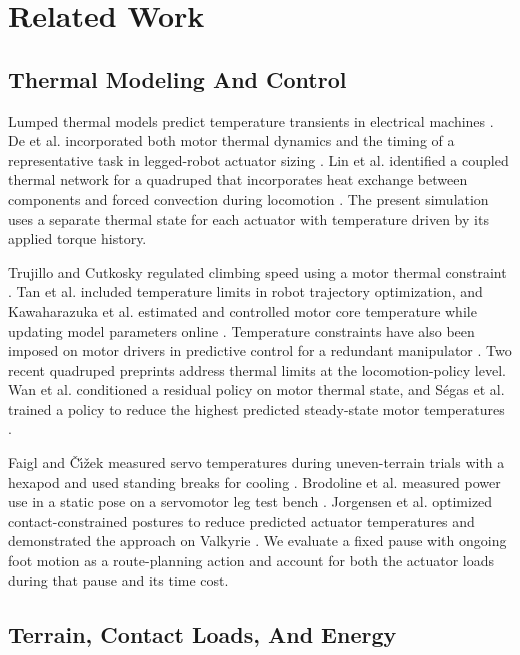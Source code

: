 \documentclass{ieeeaccess}
\begin{document}
\section{Related Work}

\subsection{Thermal Modeling And Control}

Lumped thermal models predict temperature transients in electrical machines \cite{mellor1991}. De et al. incorporated both motor thermal dynamics and the timing of a representative task in legged-robot actuator sizing \cite{de2011}. Lin et al. identified a coupled thermal network for a quadruped that incorporates heat exchange between components and forced convection during locomotion \cite{lin2025}. The present simulation uses a separate thermal state for each actuator with temperature driven by its applied torque history.

Trujillo and Cutkosky regulated climbing speed using a motor thermal constraint \cite{trujillo2009}. Tan et al. included temperature limits in robot trajectory optimization, and Kawaharazuka et al. estimated and controlled motor core temperature while updating model parameters online \cite{tan2018heat,kawaharazuka2020}. Temperature constraints have also been imposed on motor drivers in predictive control for a redundant manipulator \cite{debenedittis2026}. Two recent quadruped preprints address thermal limits at the locomotion-policy level. Wan et al. conditioned a residual policy on motor thermal state, and Ségas et al. trained a policy to reduce the highest predicted steady-state motor temperatures \cite{wan2026,segas2026}.

Faigl and \v{C}\'{\i}\v{z}ek measured servo temperatures during uneven-terrain trials with a hexapod and used standing breaks for cooling \cite{faigl2019}. Brodoline et al. measured power use in a static pose on a servomotor leg test bench \cite{brodoline2024}. Jorgensen et al. optimized contact-constrained postures to reduce predicted actuator temperatures and demonstrated the approach on Valkyrie \cite{jorgensen2019}. We evaluate a fixed pause with ongoing foot motion as a route-planning action and account for both the actuator loads during that pause and its time cost.

\subsection{Terrain, Contact Loads, And Energy}
\end{document}
